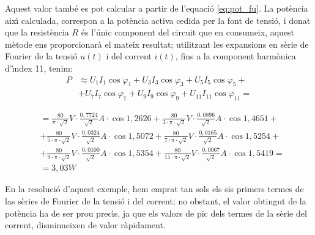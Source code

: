 \begin{exemple}
Aquest valor tamb\'{e} es pot calcular a partir de l'equaci\'{o}
\eqref{eq:pot_fu}. La pot\`{e}ncia aix\'{\i} calculada, correspon a la
pot\`{e}ncia activa cedida per la font de tensi\'{o}, i donat que la
resist\`{e}ncia $R$ \'{e}s l'\'{u}nic component del circuit que en consumeix,
aquest m\`{e}tode ens proporcionar\`{a} el mateix resultat; utilitzant les
expansions en s\`{e}rie de Fourier de la tensi\'{o} $u(t)$ i del corrent
$i(t)$, fins a la component harm\`{o}nica d'\'{\i}ndex 11, tenim:
\[\begin{split}
    P &\approx U_1 I_1 \cos\varphi_1 +  U_3 I_3 \cos\varphi_3 +
     U_5 I_5 \cos\varphi_5 +{}\\[0.7ex]
     &+  U_7 I_7 \cos\varphi_7 +
     U_9 I_9 \cos\varphi_9 + U_{11} I_{11} \cos\varphi_{11} ={}
\end{split}\]


\[\begin{split}
    &= \frac{80}{\pi\cdot\sqrt{2}}\unit{V} \cdot
    \frac{0{,}7724}{\sqrt{2}}\unit{A} \cdot \cos 1{,2626} +
    \frac{80}{3\cdot\pi\cdot\sqrt{2}}\unit{V} \cdot
    \frac{0{,}0896}{\sqrt{2}}\unit{A} \cdot \cos 1{,4651} + {} \\[0.7ex]
    &+ \frac{80}{5\cdot\pi\cdot\sqrt{2}}\unit{V} \cdot
    \frac{0{,}0324}{\sqrt{2}}\unit{A} \cdot \cos 1{,5072} +
    \frac{80}{7\cdot\pi\cdot\sqrt{2}}\unit{V} \cdot
    \frac{0{,}0165}{\sqrt{2}}\unit{A} \cdot \cos 1{,5254} + {}\\[0.7ex]
    &+ \frac{80}{9\cdot\pi\cdot\sqrt{2}}\unit{V} \cdot
    \frac{0{,}0100}{\sqrt{2}}\unit{A} \cdot \cos 1{,5354} +
    \frac{80}{11\cdot\pi\cdot\sqrt{2}}\unit{V} \cdot
    \frac{0{,}0067}{\sqrt{2}}\unit{A} \cdot \cos 1{,5419}= {}\\[0.7ex]
    &=3{,}03\unit{W}
\end{split}\]

En la resoluci\'{o} d'aquest exemple, hem emprat tan sols els sis
primers termes de las s\`{e}ries de Fourier de la tensi\'{o} i del corrent;
no obstant, el valor  obtingut de la pot\`{e}ncia ha de ser prou prec\'{\i}s, ja que
els valors de pic dels termes de la s\`{e}rie del corrent, disminueixen de
valor r\`{a}pidament.


\end{exemple}
